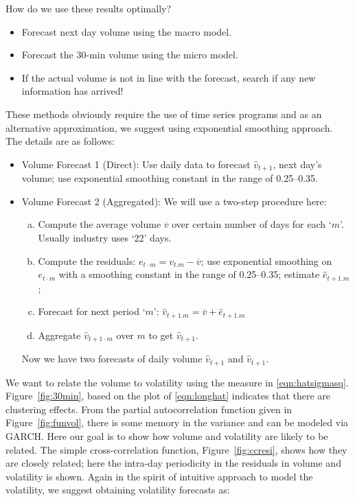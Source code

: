 How do we use these results optimally?
	\begin{itemize}
	\item Forecast next day volume using the macro model.
	\item Forecast the 30-min volume using the micro model.
	\item If the actual volume is not in line with the forecast, search if any new information has arrived!
	\end{itemize}
	
	
These methods obviously require the use of time series programs and as an alternative approximation, we suggest using exponential smoothing approach. The details are as follows:
	\begin{itemize}
	\item Volume Forecast 1 (Direct): Use daily data to forecast $\hat{v}_{t+1}$, next day's volume; use exponential smoothing constant in the range of 0.25--0.35.
	\item Volume Forecast 2 (Aggregated): We will use a two-step procedure here:
		\begin{enumerate}[(a)]
		\item Compute the average volume $\overline{v}$ over certain number of days for each `$m$'. Usually industry uses `22' days.
		\item Compute the residuals: $e_{t\cdot m} = v_{t . m} - \overline{v}$; use exponential smoothing on $e_{t\cdot m}$ with a smoothing constant in the range of 0.25--0.35; estimate $\hat{e}_{t+1 . m}$;
		\item Forecast for next period `$m$': $\hat{v}_{t+1. m}=\overline{v}+\hat{e}_{t+1 . m}$
		\item Aggregate $\hat{v}_{t+1\cdot m}$ over $m$ to get $\hat{v}_{t+1}$. 
		\end{enumerate}
	Now we have two forecasts of daily volume $\hat{v}_{t+1}$ and $\hat{v}_{t+1}$.
	\end{itemize}
We want to relate the volume to volatility using the measure in \eqref{eqn:hatsigmasq}. Figure~\ref{fig:30min}, based on the plot of \eqref{eqn:longhat} indicates that there are clustering effects. From the partial autocorrelation function given in Figure~\ref{fig:funvol}, there is some memory in the variance and can be modeled via GARCH. Here our goal is to show how volume and volatility are likely to be related. The simple cross-correlation function, Figure~\ref{fig:ccresi}, shows how they are closely related; here the intra-day periodicity in the residuals in volume and volatility is shown. Again in the spirit of intuitive approach to model the volatility, we suggest obtaining volatility forecasts as:
